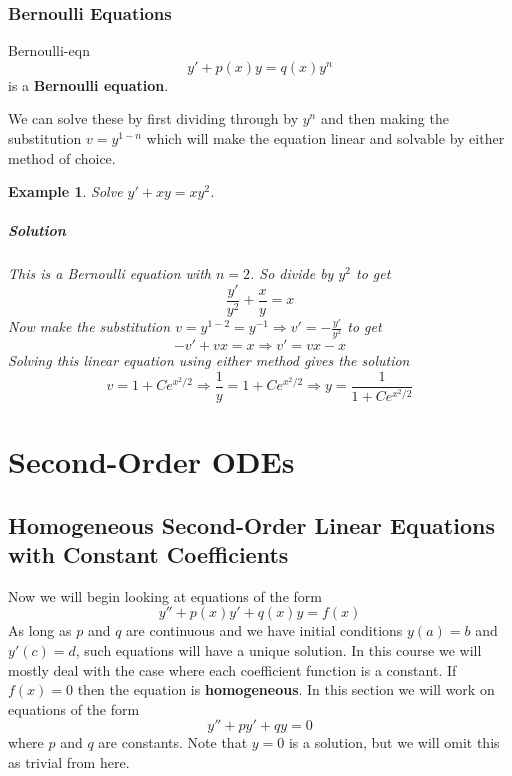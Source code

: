 \documentclass[letterpaper, 11pt, openany]{book}
\theoremstyle{mytheoremstyle}
\theoremstyle{myexamplestyle}
\newtheorem{example}{Example}[section]
\newenvironment{solution}{\paragraph{\sffamily \smaller \fontseries{b}\selectfont Solution}}{\hfill\faSquare}
\begin{document}
\subsection{Bernoulli Equations}

\begin{definition}{}{Bernoulli-eqn}
    \[y' + p(x)y = q(x)y^{n}\]
    is a \textbf{Bernoulli equation}.
\end{definition}    

We can solve these by first dividing through by \(y^{n}\) and then making the substitution \(v = y^{1-n}\) which will make the equation linear and solvable by either method of choice.

\begin{example}\label{e:de-Bernoulli}
    Solve \(y' + xy = xy^{2}\).
    \begin{solution}
        This is a Bernoulli equation with \(n=2\). So divide by \(y^{2}\) to get
        \[\frac{y'}{y^{2}} + \frac{x}{y} = x\]
        Now make the substitution \(v = y^{1-2} = y^{-1} \Rightarrow v' = -\frac{y'}{y^2}\) to get
        \[-v' + vx = x \Rightarrow v' = vx - x\]
        Solving this linear equation using either method gives the solution
        \[v = 1 + C e^{x^2/2} \Rightarrow \frac{1}{y} = 1 + C e^{x^2/2} \Rightarrow y= \frac{1}{1 + C e^{x^2/2}}\]
    \end{solution}
\end{example}

\newpage\thispagestyle{firstofchapter}
\chapter{Second-Order ODEs}
\section{Homogeneous Second-Order Linear Equations with Constant Coefficients}
\setcounter{figure}{0}
Now we will begin looking at equations of the form
\[y'' + p(x)y' + q(x)y = f(x)\]
As long as \(p\) and \(q\) are continuous and we have initial conditions \(y(a) = b\) and \(y'(c) = d\), such equations will have a unique solution. In this course we will mostly deal with the case where each coefficient function is a constant. If \(f(x) = 0\) then the equation is \textbf{homogeneous}. In this section we will work on equations of the form
\begin{equation}\label{eq:2nd-lin-hmgns-const-coeff}
    y'' + py' + qy = 0
\end{equation}
where \(p\) and \(q\) are constants. Note that \(y = 0\) is a solution, but we will omit this as trivial from here.
\end{document}
